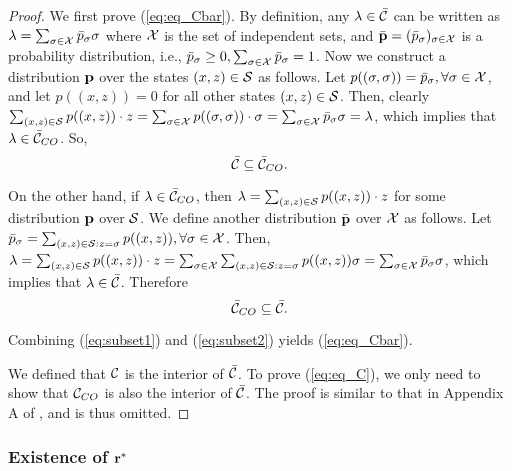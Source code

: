 \documentclass{IEEEtran}
\begin{document}
\begin{proof}
We first prove (\ref{eq:eq_Cbar}). By definition, any ${\bf \lambda}\in\bar{{\cal C}}$
can be written as ${\bf \lambda}=\sum_{\sigma\in{\cal X}}\bar{p}_{\sigma}\sigma$
where ${\cal X}$ is the set of independent sets, and $\bar{{\bf p}}=(\bar{p}_{\sigma})_{\sigma\in{\cal X}}$
is a probability distribution, i.e., $\bar{p}_{\sigma}\ge0,\sum_{\sigma\in{\cal X}}\bar{p}_{\sigma}=1$.
Now we construct a distribution ${\bf p}$ over the states $(x,z)\in{\cal S}$
as follows. Let $p((\sigma,\sigma))=\bar{p}_{\sigma},\forall\sigma\in{\cal X}$,
and let $p((x,z))=0$ for all other states $(x,z)\in{\cal S}$. Then,
clearly $\sum_{(x,z)\in{\cal S}}p((x,z))\cdot z=\sum_{\sigma\in{\cal X}}p((\sigma,\sigma))\cdot\sigma=\sum_{\sigma\in{\cal X}}\bar{p}_{\sigma}\sigma={\bf \lambda}$,
which implies that ${\bf \lambda}\in\bar{{\cal C}}_{CO}$. So, \begin{equation}
\bar{{\cal C}}\subseteq\bar{{\cal C}}_{CO}.\label{eq:subset1}\end{equation}


On the other hand, if ${\bf \lambda}\in\bar{{\cal C}}_{CO}$, then
${\bf \lambda}=\sum_{(x,z)\in{\cal S}}p((x,z))\cdot z$ for some distribution
${\bf p}$ over ${\cal S}$. We define another distribution $\bar{{\bf p}}$
over ${\cal X}$ as follows. Let $\bar{p}_{\sigma}=\sum_{(x,z)\in{\cal S}:z=\sigma}p((x,z)),\forall\sigma\in{\cal X}$.
Then, ${\bf \lambda}=\sum_{(x,z)\in{\cal S}}p((x,z))\cdot z=\sum_{\sigma\in{\cal X}}\sum_{(x,z)\in{\cal S}:z=\sigma}p((x,z))\sigma=\sum_{\sigma\in{\cal X}}\bar{p}_{\sigma}\sigma$,
which implies that ${\bf \lambda}\in\bar{{\cal C}}$. Therefore\begin{equation}
\bar{{\cal C}}_{CO}\subseteq\bar{{\cal C}}.\label{eq:subset2}\end{equation}


Combining (\ref{eq:subset1}) and (\ref{eq:subset2}) yields (\ref{eq:eq_Cbar}).

We defined that ${\cal C}$ is the interior of $\bar{{\cal C}}$.
To prove (\ref{eq:eq_C}), we only need to show that ${\cal C}_{CO}$
is also the interior of $\bar{{\cal C}}$. The proof is similar to
that in Appendix A of \cite{CSMA_longer}, and is thus omitted.
\end{proof}

\subsubsection{\label{sub:attain}Existence of ${\bf r}^{*}$ }
\end{document}
